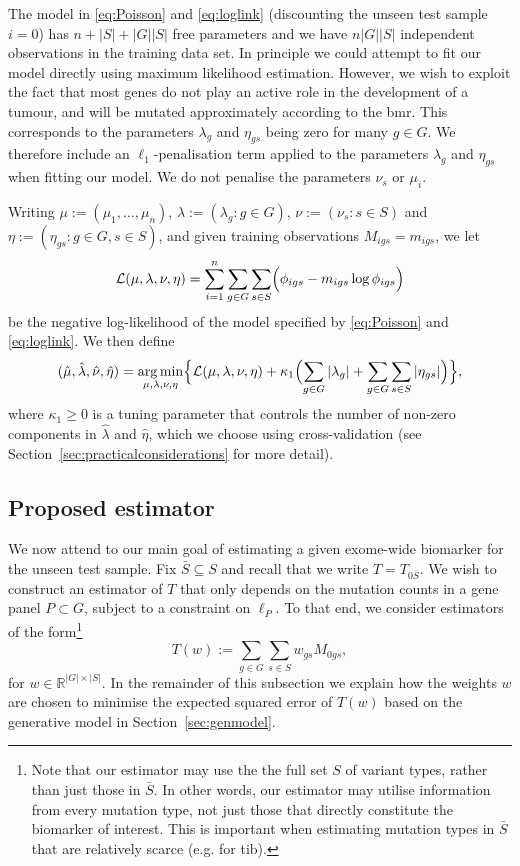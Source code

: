 \documentclass[../thesis.tex]{subfiles}
\begin{document}
The model in \eqref{eq:Poisson} and \eqref{eq:loglink} (discounting the unseen test sample $i=0$) has $n + |S| + |G||S|$ free parameters and we have $n|G||S|$ independent observations in the training data set. In principle we could attempt to fit our model directly using maximum likelihood estimation. However, we wish to exploit the fact that most genes do not play an active role in the development of a tumour, and will be mutated approximately according to the \gls{bmr}. This corresponds to the parameters $\lambda_g$ and $\eta_{gs}$ being zero for many $g \in G$. We therefore include an $\ell_1$-penalisation term applied to the parameters $\lambda_g$ and $\eta_{gs}$ when fitting our model. We do not penalise the parameters $\nu_s$ or $\mu_i$.

Writing $\mu := (\mu_1,\ldots, \mu_n)$, $\lambda := (\lambda_g :g \in G)$, $\nu := (\nu_s: s \in S)$ and $\eta := (\eta_{gs}: g\in G, s\in S)$, and given training observations $M_{igs} = m_{igs}$, we let
\[
\mathcal{L}(\mu, \lambda, \nu, \eta) = \sum_{i = 1}^n \sum_{g \in G} \sum_{s \in S} \Bigl( \phi_{igs} - m_{igs} \log \phi_{igs} \Bigr) 
\]
be the negative log-likelihood of the model specified by \eqref{eq:Poisson} and \eqref{eq:loglink}. We then define
\begin{equation}
(\hat{\mu}, \hat{\lambda}, \hat{\nu}, \hat{\eta}) = \operatorname*{arg\,min}_{\mu,\lambda, \nu, \eta} \Bigl\{ \mathcal{L}(\mu, \lambda, \nu, \eta) + \kappa_1 \Bigl(\sum_{g \in G} |\lambda_g|  +  \sum_{g \in G} \sum_{s \in S} |\eta_{gs}| \Bigr) \Bigr\},
\label{eq:genparams}
\end{equation}
where $\kappa_1 \geq 0$ is a tuning parameter that controls the number of non-zero components in $\hat{\lambda}$ and $\hat{\eta}$, which we choose using cross-validation (see Section~\ref{sec:practicalconsiderations} for more detail). 


\subsection{Proposed estimator \label{sec:linearestimator}}
We now attend to our main goal of estimating a given exome-wide biomarker for the unseen test sample. Fix $\bar{S} \subseteq S$ and recall that we write $T = T_{0\bar{S}}$. We wish to construct an estimator of $T$ that only depends on the mutation counts in a gene panel $P \subset G$, subject to a constraint on $\ell_P$. To that end, we consider estimators of the form\footnote{Note that our estimator may use the the full set $S$ of variant types, rather than just those in $\bar{S}$. In other words, our estimator may utilise information from every mutation type, not just those that directly constitute the biomarker of interest. This is important when estimating mutation types in $\bar{S}$ that are relatively scarce (e.g. for \gls{tib}).}
\[
T(w) := \sum_{g \in G} \sum_{s \in S} w_{gs}M_{0gs},
\]
for $w \in \mathbb{R}^{|G|\times |S|}$.  In the remainder of this subsection we explain how the weights $w$ are chosen to minimise the expected squared error of $T(w)$ based on the generative model in Section~\ref{sec:genmodel}. 
\end{document}
